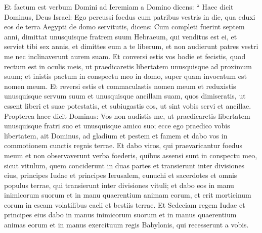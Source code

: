 \begin{biblechapter}
\begin{biblechapter}
\begin{biblechapter}
\begin{biblechapter}
\begin{biblechapter}
\begin{biblechapter}
\begin{biblechapter}
\begin{biblechapter}
\begin{biblechapter}
\begin{biblechapter}
\begin{biblechapter}
\begin{biblechapter}
\begin{biblechapter}
\begin{biblechapter}
\begin{biblechapter}
\begin{biblechapter}
\begin{biblechapter}
\begin{biblechapter}
\begin{biblechapter}
\begin{biblechapter}
\begin{biblechapter}
\begin{biblechapter}
\begin{biblechapter}
\begin{biblechapter}
\begin{biblechapter}
\begin{biblechapter}
\begin{biblechapter}
\begin{biblechapter}
\begin{biblechapter}
\begin{biblechapter}
\begin{biblechapter}
\begin{biblechapter}
\begin{biblechapter}
\begin{biblechapter}
\verse Et factum est verbum Domini ad Ieremiam a Domino dicens: 
\verse “ Haec dicit Dominus, Deus Israel: Ego percussi foedus cum patribus vestris in die, qua eduxi eos de terra Aegypti de domo servitutis, dicens: 
\verse Cum completi fuerint septem anni, dimittat unusquisque fratrem suum Hebraeum, qui venditus est ei, et serviet tibi sex annis, et dimittes eum a te liberum, et non audierunt patres vestri me nec inclinaverunt aurem suam. 
\verse Et conversi estis vos hodie et fecistis, quod rectum est in oculis meis, ut praedicaretis libertatem unusquisque ad proximum suum; et inistis pactum in conspectu meo in domo, super quam invocatum est nomen meum. 
\verse Et reversi estis et commaculastis nomen meum et reduxistis unusquisque servum suum et unusquisque ancillam suam, quos dimiseratis, ut essent liberi et suae potestatis, et subiugastis eos, ut sint vobis servi et ancillae.
 \verse Propterea haec dicit Dominus: Vos non audistis me, ut praedicaretis libertatem unusquisque fratri suo et unusquisque amico suo; ecce ego praedico vobis libertatem, ait Dominus, ad gladium et pestem et famem et dabo vos in commotionem cunctis regnis terrae. 
\verse Et dabo viros, qui praevaricantur foedus meum et non observaverunt verba foederis, quibus assensi sunt in conspectu meo, sicut vitulum, quem conciderunt in duas partes et transierunt inter divisiones eius, 
\verse principes Iudae et principes Ierusalem, eunuchi et sacerdotes et omnis populus terrae, qui transierunt inter divisiones vituli; 
 \verse et dabo eos in manu inimicorum suorum et in manu quaerentium animam eorum, et erit morticinum eorum in escam volatilibus caeli et bestiis terrae. 
\verse Et Sedeciam regem Iudae et principes eius dabo in manus inimicorum suorum et in manus quaerentium animas eorum et in manus exercituum regis Babylonis, qui recesserunt a vobis. 

\end{biblechapter}
\end{biblechapter}
\end{biblechapter}
\end{biblechapter}
\end{biblechapter}
\end{biblechapter}
\end{biblechapter}
\end{biblechapter}
\end{biblechapter}
\end{biblechapter}
\end{biblechapter}
\end{biblechapter}
\end{biblechapter}
\end{biblechapter}
\end{biblechapter}
\end{biblechapter}
\end{biblechapter}
\end{biblechapter}
\end{biblechapter}
\end{biblechapter}
\end{biblechapter}
\end{biblechapter}
\end{biblechapter}
\end{biblechapter}
\end{biblechapter}
\end{biblechapter}
\end{biblechapter}
\end{biblechapter}
\end{biblechapter}
\end{biblechapter}
\end{biblechapter}
\end{biblechapter}
\end{biblechapter}
\end{biblechapter}
